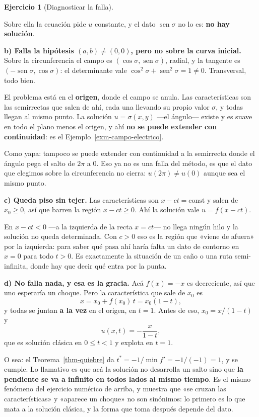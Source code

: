 \documentclass[
  spanish,
  a4paper,
]{scrbook}
\theoremstyle{definition}
\theoremstyle{plain}
\theoremstyle{definition}
\theoremstyle{plain}
\theoremstyle{definition}
\newtheorem{exercise}{Ejercicio}[chapter]
\theoremstyle{remark}
\begin{document}
\begin{exercise}[Diagnosticar la
falla]
\begin{tcolorbox}
Sobre ella la ecuación pide \(u\) constante, y el dato
\(\operatorname{sen}\sigma\) no lo es: \textbf{no hay solución}.

\textbf{b) Falla la hipótesis \((a,b)\neq(0,0)\), pero no sobre la curva
inicial.} Sobre la circunferencia el campo es
\((\cos\sigma, \operatorname{sen}\sigma)\), radial, y la tangente es
\((-\operatorname{sen}\sigma, \cos\sigma)\): el determinante vale
\(\cos^2\sigma + \operatorname{sen}^2\sigma = 1 \neq 0\). Transversal,
todo bien.

El problema está en el \textbf{origen}, donde el campo se anula. Las
características son las semirrectas que salen de ahí, cada una llevando
su propio valor \(\sigma\), y todas llegan al mismo punto. La solución
\(u = \sigma(x,y)\) ---el ángulo--- existe y es suave en todo el plano
menos el origen, y ahí \textbf{no se puede extender con continuidad}: es
el Ejemplo~\ref{exm-campo-electrico}.

Como yapa: tampoco se puede extender con continuidad a la semirrecta
donde el ángulo pega el salto de \(2\pi\) a \(0\). Eso ya no es una
falla del método, es que el dato que elegimos sobre la circunferencia no
cierra: \(u(2\pi) \neq u(0)\) aunque sea el mismo punto.

\textbf{c) Queda piso sin tejer.} Las características son
\(x - ct = \text{const}\) y salen de \(x_0 \ge 0\), así que barren la
región \(x - ct \ge 0\). Ahí la solución vale \(u = f(x-ct)\).

En \(x - ct < 0\) ---a la izquierda de la recta \(x=ct\)--- no llega
ningún hilo y la solución no queda determinada. Con \(c>0\) eso es la
región que «viene de afuera» por la izquierda: para saber qué pasa ahí
haría falta un dato de contorno en \(x=0\) para todo \(t>0\). Es
exactamente la situación de un caño o una ruta semi-infinita, donde hay
que decir qué entra por la punta.

\textbf{d) No falla nada, y esa es la gracia.} Acá \(f(x) = -x\) es
decreciente, así que uno esperaría un choque. Pero la característica que
sale de \(x_0\) es \[
x = x_0 + f(x_0)\,t = x_0(1-t) ,
\] y todas se juntan \textbf{a la vez} en el origen, en \(t = 1\). Antes
de eso, \(x_0 = x/(1-t)\) y \[
u(x,t) = -\frac{x}{1-t} ,
\] que es solución clásica en \(0 \le t < 1\) y explota en \(t=1\).

O sea: el Teorema~\ref{thm-quiebre} da
\(t^{*} = -1/\min f' = -1/(-1) = 1\), y se cumple. Lo llamativo es que
acá la solución no desarrolla un salto sino que \textbf{la pendiente se
va a infinito en todos lados al mismo tiempo}. Es el mismo fenómeno del
ejercicio numérico de arriba, y muestra que «se cruzan las
características» y «aparece un choque» no son sinónimos: lo primero es
lo que mata a la solución clásica, y la forma que toma después depende
del dato.

\end{tcolorbox}

\end{exercise}
\end{document}
